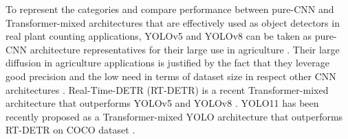 \documentclass[12pt,a4paper,oneside]{report}
\begin{document}
To represent the categories and compare performance between pure-CNN and Transformer-mixed architectures
that are effectively used as object detectors in real plant counting applications,
YOLOv5 and YOLOv8 can be taken as pure-CNN architecture representatives for their 
large use in agriculture \cite{badgujarAgriculturalObjectDetection2024}.
Their large diffusion in agriculture applications is justified by the fact that they leverage good precision
and the low need in terms of dataset size in respect other CNN architectures \cite{tanEfficientDetScalableEfficient2020,linFocalLossDense2018,zhangComparisonYOLObasedSorghum2025}.
Real-Time-DETR (RT-DETR) is a recent Transformer-mixed architecture that outperforms
YOLOv5 and YOLOv8 \cite{zhaoDETRsBeatYOLOs2024}. 
YOLO11 has been recently proposed as a
Transformer-mixed YOLO architecture that outperforms RT-DETR on COCO dataset \cite{khanamYOLOv11OverviewKey2024}.
\end{document}
